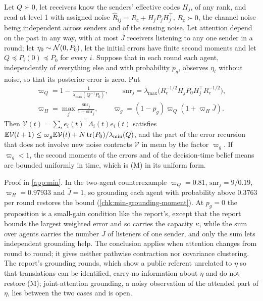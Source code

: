 \begin{proposition}\label{prop:min-grounding-moment}
Let $Q\succ0$, let receivers know the senders' effective codes $H_j$, of any rank, and read at level 1 with assigned noise $\hat R_{ij}=R_c+H_jP_jH_j^\top$, $R_c\succ0$, the channel noise being independent across senders and of the sensing noise. Let attention depend on the past in any way, with at most $\bar J$ receivers listening to any one sender in a round; let $\eta_0\sim\mathcal{N}(0,P_0)$, let the initial errors have finite second moments and let $Q\preceq P_i(0)\preceq P_0$ for every $i$. Suppose that in each round each agent, independently of everything else and with probability $p_g$, observes $\eta_t$ without noise, so that its posterior error is zero. Put
\begin{gather*}
\varpi_Q=1-\frac{1}{\lambda_{\max}(Q^{-1}P_0)},\qquad\mathrm{snr}_j=\lambda_{\max}\bigl(R_c^{-1/2}H_jP_0H_j^\top R_c^{-1/2}\bigr),\\
\varpi_H=\max_j\frac{\mathrm{snr}_j}{1+\mathrm{snr}_j},\qquad\varpi_g=(1-p_g)\varpi_Q(1+\varpi_H\bar J).
\end{gather*}
Then $\mathcal V(t)=\sum_ie_i(t)^\top\Lambda_i(t)e_i(t)$ satisfies $\mathbb{E}\mathcal V(t+1)\le\varpi_g\mathbb{E}\mathcal V(t)+N\operatorname{tr}(P_0)/\lambda_{\min}(Q)$, and the part of the error recursion that does not involve new noise contracts $\mathcal V$ in mean by the factor $\varpi_g$. If $\varpi_g<1$, the second moments of the errors and of the decision-time belief means are bounded uniformly in time, which is (M) in its uniform form.
\end{proposition}
Proof in \cref{app:min}. In the two-agent counterexample $\varpi_Q=0.81$, $\mathrm{snr}_j=9/0.19$, $\varpi_H=0.97933$ and $\bar J=1$, so grounding each agent with probability above $0.3763$ per round restores the bound (\cref{chk:min-grounding-moment}). At $p_g=0$ the proposition is a small-gain condition like the report's, except that the report bounds the largest weighted error and so carries the capacity $\kappa$, while the sum over agents carries the number $\bar J$ of listeners of one sender, and only the sum lets independent grounding help. The conclusion applies when attention changes from round to round; it gives neither pathwise contraction nor covariance clustering. The report's grounding rounds, which show a public referent unrelated to $\eta$ so that translations can be identified, carry no information about $\eta$ and do not restore (M); joint-attention grounding, a noisy observation of the attended part of $\eta$, lies between the two cases and is open.

